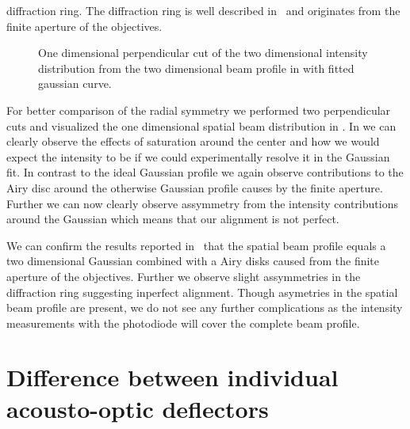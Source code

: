 diffraction ring. The diffraction ring is well described
in~\cite{Hertlein2017} and originates from the finite aperture of the
objectives.
\begin{figure}[htb]
  \centering
  \begin{adjustbox}{width=\textwidth}
    
  \end{adjustbox}
  \caption{One dimensional perpendicular cut of the two dimensional intensity
    distribution from the two dimensional beam profile in
     with fitted gaussian curve.
  }\label{fig:intensity_spatial_profile}
\end{figure}
For better comparison of the radial symmetry we performed two perpendicular
cuts and visualized the one dimensional spatial beam distribution in
.
In  we can clearly observe the effects of
saturation around the center and how we would expect the intensity to be
if we could experimentally resolve it in the Gaussian fit. In contrast to the
ideal Gaussian profile we again observe contributions to the Airy disc around
the otherwise Gaussian profile causes by the finite aperture. Further we can
now clearly observe assymmetry from the intensity contributions around the
Gaussian which means that our alignment is not perfect.

We can confirm the results reported in~\cite{Hertlein2017} that the spatial
beam profile equals a two dimensional Gaussian combined with a Airy disks
caused from the finite aperture of the objectives. Further we observe
slight assymmetries in the diffraction ring suggesting inperfect alignment.
Though asymetries in the spatial beam profile are present, we do not see any
further complications as the intensity measurements with the photodiode will
cover the complete beam profile.

\section{Difference between individual acousto-optic deflectors}

